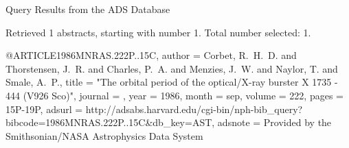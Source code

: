 Query Results from the ADS Database


Retrieved 1 abstracts, starting with number 1.  Total number selected: 1.

@ARTICLE{1986MNRAS.222P..15C,
   author = {{Corbet}, R.~H.~D. and {Thorstensen}, J.~R. and {Charles}, P.~A. and 
	{Menzies}, J.~W. and {Naylor}, T. and {Smale}, A.~P.},
    title = "{The orbital period of the optical/X-ray burster X 1735 - 444 (V926 Sco)}",
  journal = {\mnras},
     year = 1986,
    month = sep,
   volume = 222,
    pages = {15P-19P},
   adsurl = {http://adsabs.harvard.edu/cgi-bin/nph-bib_query?bibcode=1986MNRAS.222P..15C&db_key=AST},
  adsnote = {Provided by the Smithsonian/NASA Astrophysics Data System}
}


